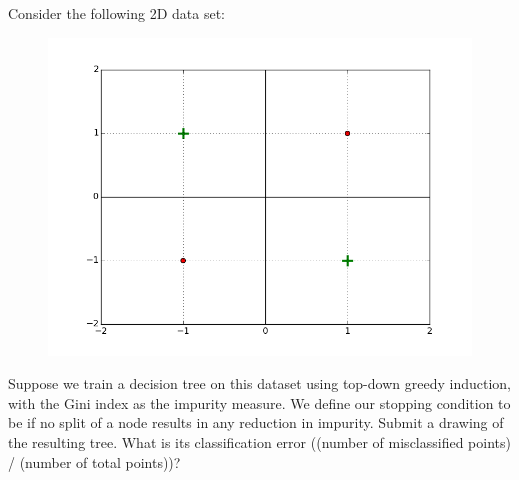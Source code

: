\problem[15] Consider the following 2D data set:
\noindent
\begin{figure}[H]
\centering
\includegraphics[scale=0.5]{1c_plot.png}
\end{figure}
\noindent
\subproblem[5] Suppose we train a decision tree on this dataset using top-down greedy induction, with the Gini index as the impurity measure. We define our stopping condition to be if no split of a node results in any reduction in impurity. Submit a drawing of the resulting tree. What is its classification error ((number of misclassified points) / (number of total points))?
